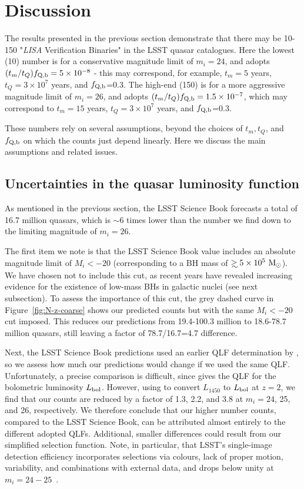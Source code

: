 \documentclass[fleqn,usenatbib]{mnras}
\newcommand\gsim{\mathrel{\rlap{\lower4pt\hbox{\hskip1pt$\sim$}}
        \raise1pt\hbox{$>$}}}
\begin{document}
\section{Discussion} \label{sec:discussion}

The results presented in the previous section demonstrate that there may be 10-150 "{\it LISA} Verification Binaries" in the LSST quasar catalogues. Here the lowest (10) number is for 
a conservative magnitude limit of $m_i=24$, and adopts
$(t_m/t_Q)f_{\rm Q,b}=5\times 10^{-8}$ - this may correspond, for example, $t_m=5$ years, $t_Q=3\times 10^7$ years, and $f_{\rm Q,b}$=0.3.  
The high-end (150) is for a more aggressive magnitude limit of $m_i=26$, and adopts
$(t_m/t_Q)f_{\rm Q,b}=1.5\times 10^{-7}$, which may correspond to $t_m=15$ years, $t_Q=3\times 10^7$ years, and $f_{\rm Q,b}$=0.3.  
    
These numbers rely on several assumptions, beyond the choices of $t_m, t_Q$, and $f_{\rm Q,b}$ on which the counts just depend linearly.   Here we discuss the main assumptions and related issues.

\subsection{Uncertainties in the quasar luminosity function} 
\label{sec:lf-uncertainty}

As mentioned in the previous section, the LSST Science Book forecasts a total of 16.7 million quasars, which is $\sim 6$ times lower than the number we find down to the limiting magnitude of $m_i=26$.

The first item we note is that the LSST Science Book value includes an absolute magnitude limit of $M_i<-20$ (corresponding to a BH mass of $\gsim 5\times 10^5~{\rm M_\odot}$).  
We have chosen not to include this cut, as recent years have revealed increasing evidence for the existence of low-mass BHs in galactic nuclei (see next subsection).  To assess the importance of this cut, the grey dashed curve in  Figure~\ref{fig:N-z-coarse} shows our predicted counts but with the same $M_i<-20$ cut imposed. This reduces our predictions from 19.4-100.3 million to 18.6-78.7 million quasars, still leaving a factor of 78.7/16.7=4.7 difference.

Next, the LSST Science Book predictions used an earlier QLF determination by \citet{Hopkins2007}, so we assess how much our predictions would change if we used the same QLF. Unfortunately, a precise comparison is difficult, since \citet{Hopkins2007} gives the QLF for the bolometric luminosity $L_{\rm bol}$.  However, using \citet{Runnoe+2012} to convert $L_{1450}$ to $L_{\rm bol}$ at $z=2$, we find that our counts are reduced by a factor of 1.3, 2.2, and 3.8 at $m_i=24$, 25, and 26, respectively.  We therefore conclude that our higher number counts, compared to the LSST Science Book, can be attributed almost entirely to the different adopted QLFs.
Additional, smaller differences could result from our simplified selection function.  Note, in particular, that LSST's single-image detection efficiency incorporates selections via colours, lack of proper motion, variability, and combinations with external data, and drops below unity at $m_i=24-25$~\citep{Ivezic+2014}.
\end{document}

